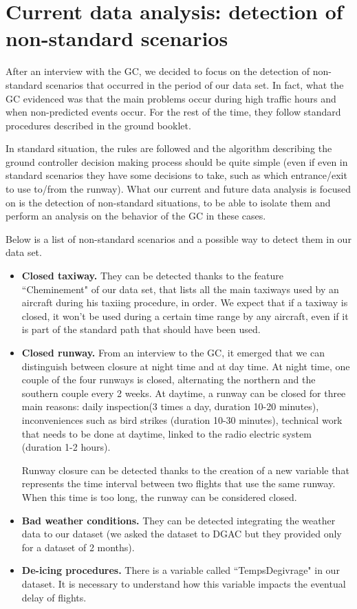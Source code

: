 \documentclass{article}
\begin{document}
\section{Current data analysis: detection of non-standard scenarios}\label{non-standard}
After an interview with the GC, we decided to focus on the detection of non-standard scenarios that occurred in the period of our data set.
In fact, what the GC evidenced was that the main problems occur during high traffic hours and when non-predicted events occur. For the rest of the time, they follow standard procedures described in the ground booklet\cite{livret}.

In standard situation, the rules are followed and the algorithm describing the ground controller decision making process should be quite simple (even if even in standard scenarios they have some decisions to take, such as which entrance/exit to use to/from the runway).
What our current and future data analysis is focused on is the detection of non-standard situations, to be able to isolate them and perform an analysis on the behavior of the GC in these cases.

Below is a list of non-standard scenarios and a possible way to detect them in our data set.
\begin{itemize}
	\item \textbf{Closed taxiway.} They can be detected thanks to the feature ``Cheminement" of our data set, that lists all the main taxiways used by an aircraft during his taxiing procedure, in order. We expect that if a taxiway is closed, it won't be used during a certain time range by any aircraft, even if it is part of the standard path that should have been used.
	\item \textbf{Closed runway.} From an interview to the GC, it emerged that we can distinguish between closure at night time and at day time. At night time, one couple of the four runways is closed, alternating the northern and the southern couple every 2 weeks. At daytime, a runway can be closed for three main reasons: daily inspection(3 times a day, duration 10-20 minutes), inconveniences such as bird strikes (duration 10-30 minutes), technical work that needs to be done at daytime, linked to the radio electric system (duration 1-2 hours).
	
	Runway closure can be detected thanks to the creation of a new variable that represents the time interval between two flights that use the same runway. When this time is too long, the runway can be considered closed.
	\item \textbf{Bad weather conditions.} They can be detected integrating the weather data to our dataset (we asked the dataset to DGAC but they provided only for a dataset of 2 months).
	\item \textbf{De-icing procedures.} There is a variable called ``TempsDegivrage" in our dataset. It is necessary to understand how this variable impacts the eventual delay of flights.
\end{itemize}
\end{document}
